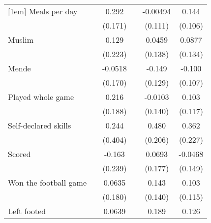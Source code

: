 {\begin{tabular}{l*{5}{c}}
[1em]
Meals per day       &                     &       0.292\sym{*}  &                     &    -0.00494         &       0.144         \\
                    &                     &     (0.171)         &                     &     (0.111)         &     (0.106)         \\
[1em]
Muslim              &                     &       0.129         &                     &      0.0459         &      0.0877         \\
                    &                     &     (0.223)         &                     &     (0.138)         &     (0.134)         \\
[1em]
Mende               &                     &     -0.0518         &                     &      -0.149         &      -0.100         \\
                    &                     &     (0.170)         &                     &     (0.129)         &     (0.107)         \\
[1em]
Played whole game   &                     &       0.216         &                     &     -0.0103         &       0.103         \\
                    &                     &     (0.188)         &                     &     (0.140)         &     (0.117)         \\
[1em]
Self-declared skills&                     &       0.244         &                     &       0.480\sym{**} &       0.362         \\
                    &                     &     (0.404)         &                     &     (0.206)         &     (0.227)         \\
[1em]
Scored              &                     &      -0.163         &                     &      0.0693         &     -0.0468         \\
                    &                     &     (0.239)         &                     &     (0.177)         &     (0.149)         \\
[1em]
Won the football game&                     &      0.0635         &                     &       0.143         &       0.103         \\
                    &                     &     (0.180)         &                     &     (0.140)         &     (0.115)         \\
[1em]
Left footed         &                     &      0.0639         &                     &       0.189         &       0.126         \\

\end{tabular}}
